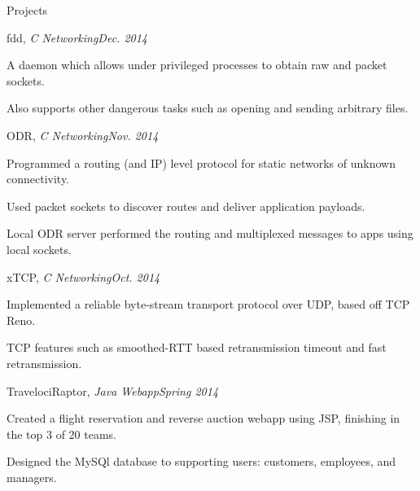 \documentclass{resume} %
\begin{document}
\begin{rSection}{Projects}

\begin{rSubsection}{fdd, {\em C Networking}}{{\em Dec. 2014}}{}{}
\item A daemon which allows under privileged processes to obtain raw and packet sockets.
\item Also supports other dangerous tasks such as opening and sending arbitrary files.
\end{rSubsection}

\begin{rSubsection}{ODR, {\em C Networking}}{{\em Nov. 2014}}{}{}
\item Programmed a routing (and IP) level protocol for static networks of unknown connectivity.
\item Used packet sockets to discover routes and deliver application payloads.
\item Local ODR server performed the routing and multiplexed messages to apps using local sockets.
\end{rSubsection}

\begin{rSubsection}{xTCP, {\em C Networking}}{{\em Oct. 2014}}{}{}
\item Implemented a reliable byte-stream transport protocol over UDP, based off TCP Reno.
\item TCP features such as smoothed-RTT based retransmission timeout and fast retransmission.
\end{rSubsection}

\begin{rSubsection}{TravelociRaptor, {\em Java Webapp}}{{\em Spring 2014}}{}{}
\item Created a flight reservation and reverse auction webapp using JSP, finishing in the top 3 of 20 teams.
\item Designed the MySQl database to supporting users: customers, employees, and managers.
\end{rSubsection}


\end{rSection}
\end{document}
